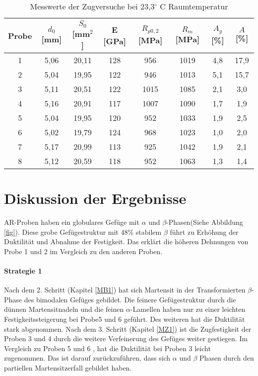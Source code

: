 \begin{table}
	\centering
	\begin{tabular}{|c|c|c|c|c|c|c|c|}
		\hline
		Probe & $d_0$ [mm] & $S_0$ [mm$^2$] & E [GPa] & $R_{p0,2}$ [MPa]& $R_m$ [MPa]& $A_g$ [\%]& $A$ [\%]\\
		\hline
		1 & 5,06 & 20,11 & 128 & 956 & 1019&4,8&17,9 \\
		\hline
		2 &5,04&19,95&122&946&1013&5,1&15,7\\
		\hline
		3 & 5,11&20,51& 122&1015&1085&2,1&3,0\\
		\hline
		4 &5,16& 20,91& 117 & 1007& 1090& 1,7&  1,9 \\
		\hline
		5&5,04 &19,95& 120& 952& 1033& 1,9 &2,5\\
		\hline
		6 &5,02& 19,79& 124& 968& 1023 &1,0 & 2,0\\
		\hline
		7&5,17& 20,99& 113& 925& 1042& 1,9& 2,1\\
		\hline
		8 & 5,12 & 20,59 & 118 & 952 & 1063 & 1,3 & 1,4\\
		\hline
	\end{tabular}
	\label{tab:zugversuche}
	\caption{Messwerte der Zugversuche bei 23,3$^\circ$ C Raumtemperatur}
\end{table}

\section{Diskussion der Ergebnisse}
AR-Proben haben ein globulares Gefüge mit $\alpha$ und $\beta$-Phasen(Siehe Abbildung \ref{fig}). Diese grobe Gefügestruktur mit 48\% stabilem $\beta$ führt zu Erhöhung der Duktilität und Abnahme der Festigkeit. Das erklärt die höheren Dehnungen von Probe 1 und 2 im Vergleich zu den anderen Proben.

\paragraph{Strategie 1}
Nach dem 2. Schritt (Kapitel \ref{MB1}) hat sich Martensit in der Transformierten $\beta$-Phase des bimodalen Gefüges gebildet. Die feinere Gefügestruktur  durch die dünnen Martensitnadeln und die feinen $\alpha$-Lamellen  haben nur zu einer leichten Festigkeitssteigerung bei Probe5 und 6 geführt. Des weiteren hat die Duktilität stark  abgenommen.
Nach dem 3. Schritt (Kapitel \ref{MZ1}) ist die Zugfestigkeit der Proben 3 und 4 durch die weitere Verfeinerung des Gefüges weiter gestiegen. Im Vergleich zu Proben 5 und 6 , hat die Duktilität bei Proben 3 leicht zugenommen. Das ist  darauf zurückzuführen, dass sich  $\alpha$ und  $\beta$ Phasen durch den partiellen Martensitzerfall gebildet haben.


